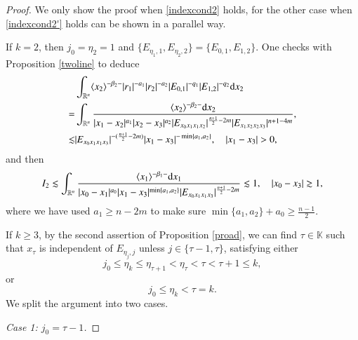 \documentclass[11pt,reqno]{amsart}
\def\d{{\rm d}}
\numberwithin{equation}{section}
\theoremstyle{definition}
\begin{document}
\begin{proof}
	We only show the proof when \eqref{indexcond2} holds, for the other case when \eqref{indexcond2'} holds can be shown in a parallel way.
	
	If $k=2$, then $j_0=\eta_2=1$ and $\{E_{\eta_1,1},E_{\eta_2,2}\}=\{E_{0,1},E_{1,2}\}$. One checks with Proposition \ref{twoline} to deduce
	\begin{equation*}
		\begin{split}
			&\int_{\mathbb{R}^{n}}\langle x_2\rangle^{-\beta_2-}|r_1|^{-a_1}|r_2|^{-a_2}|E_{0,1}|^{-q_1}|E_{1,2}|^{-q_2}\d x_2\\
			=&\int_{\mathbb{R}^{n}}\frac{\langle x_2\rangle^{-\beta_2-}\d x_2}{|x_1-x_2|^{a_1}|x_2-x_3|^{a_2}|E_{x_0x_1x_1x_2}|^{\frac{n+1}{2}-2m}|E_{x_1x_2x_2x_3}|^{n+1-4m}},\\
			\lesssim&|E_{x_0x_1x_1x_3}|^{-(\frac{n+1}{2}-2m)}|x_1-x_3|^{-\min\{a_1,a_2\}},\quad|x_1-x_3|>0,
		\end{split}
	\end{equation*}
	and then
	\begin{equation*}
		I_2\lesssim\int_{\mathbb{R}^n}\frac{\langle x_1\rangle^{-\beta_1-}\d x_1}{|x_0-x_1|^{a_0}|x_1-x_3|^{\min\{a_1,a_2\}}|E_{x_0x_1x_1x_3}|^{\frac{n+1}{2}-2m}}\lesssim1,\quad|x_0-x_3|\gtrsim1,
	\end{equation*}
	where we have used $a_1\geq n-2m$ to make sure $\min\{a_1,a_2\}+a_0\geq\frac{n-1}{2}$.
	
	If $k\geq3$, by the second assertion of Proposition \ref{proad}, we can find $\tau\in\mathbb{K}$ such that $x_{\tau}$ is independent of $E_{\eta_j,j}$ unless $j\in\{\tau-1,\tau\}$, satisfying either
	\begin{equation*}\label{j_01}
		j_0\leq\eta_k\leq\eta_{\tau+1}<\eta_\tau<\tau<\tau+1\leq k,
	\end{equation*}
	or
	\begin{equation*}\label{j_02}
		j_0\leq\eta_k<\tau=k.
	\end{equation*}
	We split the argument into two cases.
	
	
	\noindent\emph{Case 1: $j_0=\tau-1$.}
	

\end{proof}
\end{document}
